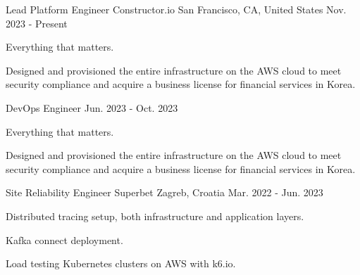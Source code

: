 

\begin{cventries}

  \cventry
    {Lead Platform Engineer} %
    {Constructor.io} %
    {San Francisco, CA, United States} %
    {Nov. 2023 - Present} %
    {
      \begin{cvitems} %
        \item {Everything that matters.}
        \item {Designed and provisioned the entire infrastructure on the AWS cloud to meet security compliance and acquire a business license for financial services in Korea.}
      \end{cvitems}
    }

  \cventry
    {DevOps Engineer} %
    {} %
    {} %
    {Jun. 2023 - Oct. 2023} %
  {
    \begin{cvitems} %
      \item {Everything that matters.}
      \item {Designed and provisioned the entire infrastructure on the AWS cloud to meet security compliance and acquire a business license for financial services in Korea.}
    \end{cvitems}
  }

  \cventry
    {Site Reliability Engineer} %
    {Superbet} %
    {Zagreb, Croatia} %
    {Mar. 2022 - Jun. 2023} %
    {
      \begin{cvitems} %
        \item {Distributed tracing setup, both infrastructure and application layers.}
        \item {Kafka connect deployment.}
        \item {Load testing Kubernetes clusters on AWS with k6.io.}
      \end{cvitems}
    }


\end{cventries}
